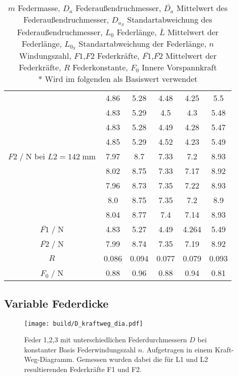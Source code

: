 \begin{table}[H]
\begin{tabular}{c | c c c c c}
                         & 4.86 & 5.28 & 4.48 & 4.25 & 5.5\\
                         & 4.83 & 5.29 & 4.5 & 4.3 & 5.48\\
                         & 4.83 & 5.28 & 4.49 & 4.28 & 5.47\\
                         & 4.85 & 5.29 & 4.52 & 4.23 & 5.49\\
        \midrule
        $F2\;/\;$N bei $L2=142\;$mm & 7.97 & 8.7 & 7.33 & 7.2 & 8.93\\
                         & 8.02 & 8.75 & 7.33 & 7.17 & 8.92\\
                         & 7.96 & 8.73 & 7.35 & 7.22 & 8.93\\
                         & 8.0 & 8.75 & 7.35 & 7.2 & 8.9\\
                         & 8.04 & 8.77 & 7.4 & 7.14 & 8.93\\
        \midrule
        $\bar{F1}\;/\;$N & 4.83 & 5.27 & 4.49 & 4.264 & 5.49\\
        $\bar{F2}\;/\;$N & 7.99 & 8.74 & 7.35 & 7.19 & 8.92\\
        \midrule
        $R$ & 0.086 & 0.094 & 0.077 & 0.079 & 0.093\\
        \midrule
        $F_0\;/\;$N & 0.88 & 0.96 & 0.88 & 0.94 & 0.81\\ 
        \bottomrule
    \end{tabular}
    \caption{$m$ Federmasse,
             $D_a$ Federaußendruchmesser, 
             $\bar{D_a}$ Mittelwert des Federaußendruchmesser, 
             $D_{a_S}$ Standartabweichung des Federaußendruchmesser,
             $L_0$ Federlänge,
             $\bar{L}$ Mittelwert der Federlänge,
             $L_{0_S}$ Standartabweichung der Federlänge,
             $n$ Windungszahl,
             $F1$,$F2$ Federkräfte,
             $\bar{F1}$,$\bar{F2}$ Mittelwert der Federkräfte,
             $R$ Federkonstante,
             $F_0$ Innere Vorspannkraft\\
             * Wird im folgenden als Basiswert verwendet
    }
    \label{tab:Wertetabelle}
\end{table}


\subsection{Variable Federdicke}
\begin{figure}[H]
    \center
    \texttt{[image: build/D\_kraftweg\_dia.pdf]}
    \caption{Feder 1,2,3 mit unterschiedlichen Federdurchmessern $D$ bei konstanter Basis Federwindungszahl $n$.
    Aufgetragen in einem Kraft-Weg-Diagramm. Gemessen wurden dabei
    die für L1 und L2 resultierenden Federkräfte F1 und F2.}
    \label{tab:LF_D}
\end{figure}
